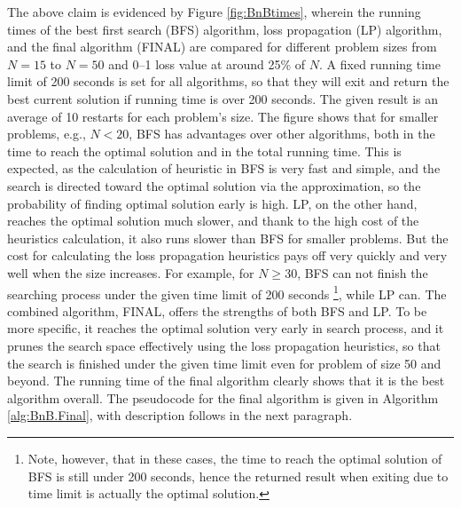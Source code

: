 The above claim is evidenced by Figure \ref{fig:BnBtimes}, wherein the running times of the best first search (BFS) algorithm, loss propagation (LP) algorithm, and the final algorithm (FINAL) are compared for different problem sizes from $N=15$ to $N=50$ and 0--1 loss value at around 25\% of $N$. A fixed running time limit of 200 seconds is set for all algorithms, so that they will exit and return the best current solution if running time is over 200 seconds. The given result is an average of 10 restarts for each problem's size. The figure shows that for smaller problems, e.g., $N<20$, BFS has advantages over other algorithms, both in the time to reach the optimal solution and in the total running time. This is expected, as the calculation of heuristic in BFS is very fast and simple, and the search is directed toward the optimal solution via the approximation, so the probability of finding optimal solution early is high. LP, on the other hand, reaches the optimal solution much slower, and thank to the high cost of the heuristics calculation, it also runs slower than BFS for smaller problems. But the cost for calculating the loss propagation heuristics pays off very quickly and very well when the size increases. For example, for $N \geq 30$, BFS can not finish the searching process under the given time limit of 200 seconds \footnote{Note, however, that in these cases, the time to reach the optimal solution of BFS is still under 200 seconds, hence the returned result when exiting due to time limit is actually the optimal solution.}, while LP can.  The combined algorithm, FINAL, offers the strengths of both BFS and LP. To be more specific, it reaches the optimal solution very early in search process, and it prunes the search space effectively using the loss propagation heuristics, so that the search is finished under the given time limit even for problem of size 50 and beyond. The running time of the final algorithm clearly shows that it is the best algorithm overall. The pseudocode for the final algorithm is given in Algorithm \ref{alg:BnB.Final}, with description follows in the next paragraph.

